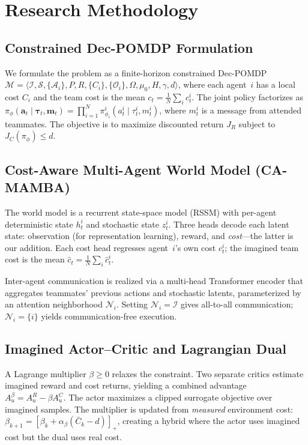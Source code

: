 \documentclass[12pt,a4paper]{article}
\begin{document}
\section{Research Methodology}

\subsection{Constrained Dec-POMDP Formulation}

We formulate the problem as a finite-horizon constrained Dec-POMDP $\mathcal{M} = \langle \mathcal{I}, \mathcal{S}, \{\mathcal{A}_i\}, P, R, \{C_i\}, \{\mathcal{O}_i\}, \Omega, \mu_0, H, \gamma, d \rangle$, where each agent~$i$ has a local cost $C_i$ and the team cost is the mean $c_t = \frac{1}{N}\sum_{i} c_t^i$.
The joint policy factorizes as $\pi_\phi(\mathbf{a}_t \mid \boldsymbol{\tau}_t, \mathbf{m}_t) = \prod_{i=1}^{N} \pi_{\phi_i}^i(a_t^i \mid \tau_t^i, m_t^i)$, where $m_t^i$ is a message from attended teammates.
The objective is to maximize discounted return $J_R$ subject to $J_C(\pi_\phi) \leq d$.

\subsection{Cost-Aware Multi-Agent World Model (CA-MAMBA)}

The world model is a recurrent state-space model (RSSM) with per-agent deterministic state $h_t^i$ and stochastic state $z_t^i$.
Three heads decode each latent state: observation (for representation learning), reward, and \emph{cost}---the latter is our addition.
Each cost head regresses agent~$i$'s own cost $c_t^i$; the imagined team cost is the mean $\hat{c}_t = \frac{1}{N}\sum_i \hat{c}_t^i$.

Inter-agent communication is realized via a multi-head Transformer encoder that aggregates teammates' previous actions and stochastic latents, parameterized by an attention neighborhood $\mathcal{N}_i$.
Setting $\mathcal{N}_i = \mathcal{I}$ gives all-to-all communication; $\mathcal{N}_i = \{i\}$ yields communication-free execution.

\subsection{Imagined Actor--Critic and Lagrangian Dual}

A Lagrange multiplier $\beta \geq 0$ relaxes the constraint.
Two separate critics estimate imagined reward and cost returns, yielding a combined advantage $A_u^\beta = A_u^R - \beta A_u^C$.
The actor maximizes a clipped surrogate objective over imagined samples.
The multiplier is updated from \emph{measured} environment cost: $\beta_{k+1} = [\beta_k + \alpha_\beta(\bar{C}_k - d)]_+$, creating a hybrid where the actor uses imagined cost but the dual uses real cost.
\end{document}

